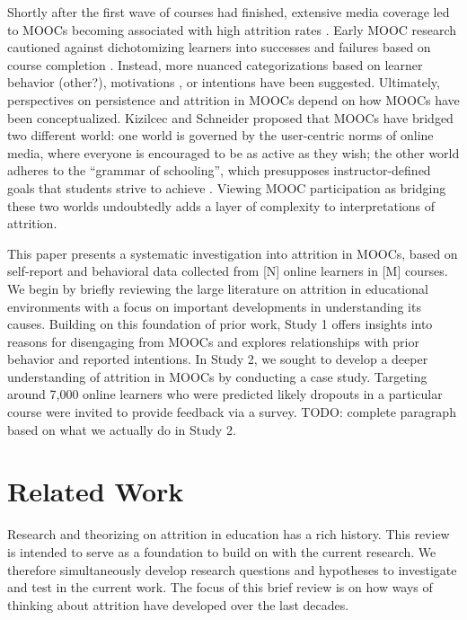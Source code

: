 \documentclass{sigchi}\usepackage[]{graphicx}\usepackage[]{color}
\begin{document}
Shortly after the first wave of courses had finished, extensive media coverage led to MOOCs becoming associated with high attrition rates \cite{lewin2013after,parr2013mooc,guthrie2013moocs}. Early MOOC research cautioned against dichotomizing learners into successes and failures based on course completion \cite{kizilcec2013deconstructing,rivard2013measuring}. Instead, more nuanced categorizations based on learner behavior \cite{kizilcec2013deconstructing,clow2013moocs} (other?), motivations \cite{kizilcec2015motivation}, or intentions \cite{wilkowski2014student} have been suggested. Ultimately, perspectives on persistence and attrition in MOOCs depend on how MOOCs have been conceptualized. Kizilcec and Schneider \citeyear{kizilcec2015motivation} proposed that MOOCs have bridged two different world: one world is governed by the user-centric norms of online media, where everyone is encouraged to be as active as they wish; the other world adheres to the ``grammar of schooling'', which presupposes instructor-defined goals that students strive to achieve \cite{tyack1994grammar}. Viewing MOOC participation as bridging these two worlds undoubtedly adds a layer of complexity to interpretations of attrition.

This paper presents a systematic investigation into attrition in MOOCs, based on self-report and behavioral data collected from [N] online learners in [M] courses. We begin by briefly reviewing the large literature on attrition in educational environments with a focus on important developments in understanding its causes. Building on this foundation of prior work, Study 1 offers insights into reasons for disengaging from MOOCs and explores relationships with prior behavior and reported intentions. In Study 2, we sought to develop a deeper understanding of attrition in MOOCs by conducting a case study. Targeting around 7,000 online learners who were predicted likely dropouts in a particular course were invited to provide feedback via a survey. 
TODO: complete paragraph based on what we actually do in Study 2.


\section{Related Work}

Research and theorizing on attrition in education has a rich history. This review is intended to serve as a foundation to build on with the current research. We therefore simultaneously develop research questions and hypotheses to investigate and test in the current work. The focus of this brief review is on how ways of thinking about attrition have developed over the last decades. 
\end{document}

